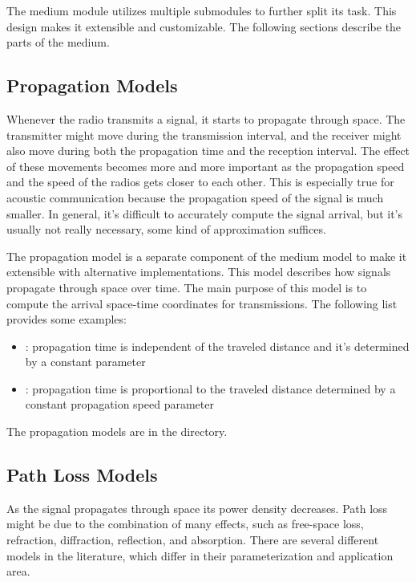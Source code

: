 The medium module utilizes multiple submodules to further split its task. This
design makes it extensible and customizable. The following sections describe
the parts of the medium.

\subsection{Propagation Models}

Whenever the radio transmits a signal, it starts to propagate through space. The
transmitter might move during the transmission interval, and the receiver might
also move during both the propagation time and the reception interval. The
effect of these movements becomes more and more important as the propagation
speed and the speed of the radios gets closer to each other. This is especially
true for  acoustic communication because the propagation speed of the signal is
much smaller. In general, it's difficult to accurately compute the signal
arrival, but it's usually not really necessary, some kind of approximation
suffices.

The propagation model is a separate component of the medium model to make it
extensible with alternative implementations. This model describes how signals
propagate through space over time. The main purpose of this model is to compute
the arrival space-time coordinates for transmissions. The following list
provides some examples:

\begin{itemize}
  \item {}: propagation time is independent of
the traveled distance and it's determined by a constant parameter
  \item {}: propagation time is proportional to
the traveled distance determined by a constant propagation speed parameter

\end{itemize}

The propagation models are in the  directory.

\subsection{Path Loss Models}

As the signal propagates through space its power density decreases. Path loss
might be due to the combination of many effects, such as free-space loss,
refraction, diffraction, reflection, and absorption. There are several different
models in the literature, which differ in their parameterization and application
area.

